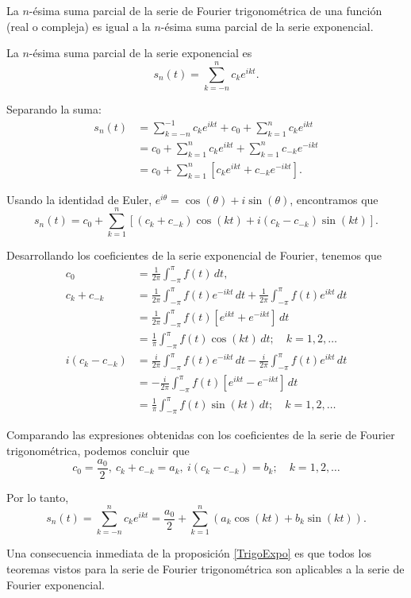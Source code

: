 
\begin{propo} \label{TrigoExpo}
La $n$-ésima suma parcial de la serie de Fourier trigonométrica de una función (real o compleja) es igual a la $n$-ésima suma parcial de la serie exponencial.
\end{propo}

\begin{demo}
La $n$-ésima suma parcial de la serie exponencial es
$$ s_n(t) = \sum_{k=-n}^n c_k e^{ikt}.$$

Separando la suma:
\begin{align*}
    s_n(t) &= \sum_{k=-n}^{-1} c_k e^{ikt} + c_0 + \sum_{k=1}^n c_k e^{ikt} \\
    &= c_0 + \sum_{k=1}^n c_k e^{ikt} + \sum_{k=1}^n c_{-k} e^{-ikt} \\
    &= c_0 + \sum_{k=1}^n [c_k e^{ikt} + c_{-k} e^{-ikt}]. 
\end{align*}

Usando la identidad de Euler, $e^{i\theta} = \cos(\theta) + i \sin(\theta)$, encontramos que
$$s_n(t) = c_0 +  \sum_{k=1}^n [(c_k + c_{-k}) \cos(kt) + i(c_k - c_{-k}) \sin(kt)].$$

Desarrollando los coeficientes de la serie exponencial de Fourier, tenemos que
\begingroup
\allowdisplaybreaks
\begin{align*}
    c_0 &= \frac{1}{2\pi} \int_{-\pi}^{\pi} f(t) \,dt, \\
    c_k + c_{-k} &= \frac{1}{2\pi} \int_{-\pi}^{\pi} f(t) e^{-ikt} \,dt + \frac{1}{2\pi} \int_{-\pi}^{\pi} f(t) e^{ikt} \,dt  \\
    &= \frac{1}{2\pi} \int_{-\pi}^{\pi} f(t) [e^{ikt} + e^{-ikt}] \,dt \\
    &= \frac{1}{\pi} \int_{-\pi}^{\pi} f(t) \cos(kt) \,dt; \quad k = 1,2, \dots\\
   i( c_k - c_{-k}) &= \frac{i}{2\pi} \int_{-\pi}^{\pi} f(t) e^{-ikt} \,dt - \frac{i}{2\pi} \int_{-\pi}^{\pi} f(t) e^{ikt} \,dt \\
   &= - \frac{i}{2\pi} \int_{-\pi}^{\pi} f(t) [e^{ikt} - e^{-ikt}] \,dt \\
   &= \frac{1}{\pi} \int_{-\pi}^{\pi} f(t) \sin(kt)\,dt; \quad k = 1,2, \dots
\end{align*}
\endgroup

Comparando las expresiones obtenidas con los coeficientes de la serie de Fourier trigonométrica, podemos concluir que 
$$c_0 = \frac{a_0}{2}, ~  c_k + c_{-k} = a_k, ~ i( c_k - c_{-k}) = b_k; \quad k = 1,2, \dots$$

Por lo tanto, 
$$ s_n(t) = \sum_{k=-n}^n c_k e^{ikt} = \frac{a_0}{2} + \sum_{k=1}^n (a_k \cos(kt) + b_k \sin(kt)).$$

\end{demo}
Una consecuencia inmediata de la proposición \ref{TrigoExpo} es que todos los teoremas vistos para la serie de Fourier trigonométrica son aplicables a la serie de Fourier exponencial.

